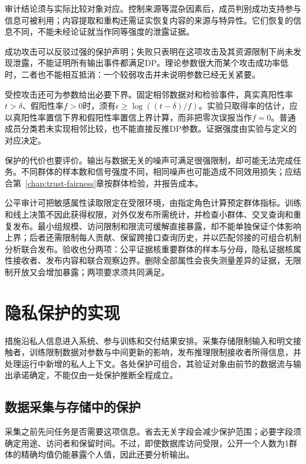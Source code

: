 审计结论须与实际比较对象对应。控制来源等混杂因素后，成员判别成功支持参与信息可被利用；内容提取和重构还需证实恢复内容的来源与特异性。它们恢复的信息不同，不能未经论证就当作同等强度的泄露证据。

成功攻击可以反驳过强的保护声明；失败只表明在这项攻击及其资源限制下尚未发现泄露，不能证明所有输出事件都满足DP。理论参数很大而某个攻击成功率低时，二者也不能相互抵消：一个较弱攻击并未说明参数已经无关紧要。

受控攻击还可为参数给出必要下界。固定相邻数据对和检验事件，真实真阳性率$t>\delta$、假阳性率$f>0$时，须有$\epsilon\geq\log((t-\delta)/f)$。实验只取得率的估计，应以真阳性率置信下界和假阳性率置信上界计算，而非把零次误报当作$f=0$。普通成员分类若未实现相邻比较，也不能直接反推DP参数。证据强度由实验与定义的对应决定。

保护的代价也要评价。输出与数据无关的噪声可满足很强限制，却可能无法完成任务。不同群体的样本数和信号强度不同，相同噪声也可能造成不同效用损失；应结合第~\ref{chap:trust-fairness}章按群体检验，并报告成本。

公平审计可把敏感属性读取限定在受限环境，由指定角色计算预定群体指标。训练和线上决策不因此获得权限，对外仅发布所需统计，并检查小群体、交叉查询和重复发布。最小组规模、访问限制和限流可缓解直接暴露，却不能单独保证个体影响上界；后者还需限制每人贡献、保留跨接口查询历史，并以匹配邻接的可组合机制分析联合发布。验收也分两项：公平证据核重要群体的样本与分母，隐私证据核属性接收者、发布内容和联合观察边界。删除全部属性会丧失测量差异的证据，无限制开放又会增加暴露；两项要求须共同满足。

\section{隐私保护的实现}
\label{sec:privacy-use}

措施沿私人信息进入系统、参与训练和交付结果安排。采集存储限制输入和明文接触者，训练限制数据对参数与中间更新的影响，发布推理限制接收者所得信息，并处理运行中新增的私人上下文。各处保护可组合，其验证对象由前节的数据流与输出承诺确定，不能仅由一处保护推断全程成立。

\subsection{数据采集与存储中的保护}
\label{sec:privacy-collection}

采集之前先问任务是否需要这项信息。省去无关字段会减少保护范围；必要字段须确定用途、访问者和保留时间。不过，即使数据库访问受限，公开一个人数为1群体的精确均值仍能暴露个人值，因此还要分析输出。

